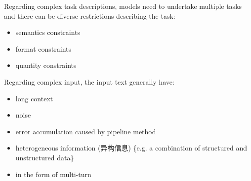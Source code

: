 \documentclass{beamer}
\begin{document}
\begin{frame}
    Regarding complex task descriptions, models need to undertake multiple tasks and there can be diverse restrictions describing the task:
    \begin{itemize}
        \item {semantics constraints}
        \item {format constraints}
        \item {quantity constraints}
    \end{itemize}
    Regarding complex input, the input text generally have:
    \begin{itemize}
        \item {long context}
        \item {noise}
        \item {error accumulation caused by pipeline method}
        \item {heterogeneous information (异构信息) \{e.g. a combination of structured and unstructured data\}}
        \item {in the form of multi-turn}
    \end{itemize}
\end{frame}
\end{document}
